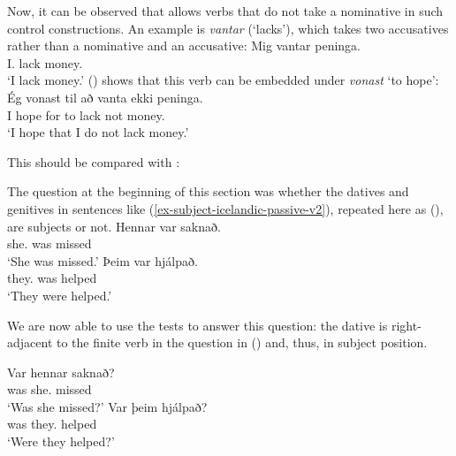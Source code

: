 Now, it can be observed that  allows verbs that do not take a nominative in such control
constructions. An example is \emph{vantar} (`lacks'), which takes two accusatives rather than a
nominative and an accusative:
\ea
\gll Mig      vantar peninga.\\
     I.\ACC{} lack   money.\ACC\\\icelandic
\glt `I lack money.'
\z
() shows that this verb can be embedded under \emph{vonast} `to hope':
\ea
\gll Ég vonast til að vanta ekki peninga.\\
     I  hope   for to lack  not  money.\ACC\\\icelandic
\glt `I hope that I do not lack money.'
\z

\noindent
This should be compared with :
\eal
{}
\zl

\noindent
The question at the beginning of this section was whether the datives and genitives in sentences
like (\ref{ex-subject-icelandic-passive-v2}), repeated here as (), are subjects or not.
\eal
\ex 
\gll Hennar     var saknað.\\
     she.\GEN{} was missed\\\icelandic
\glt `She was missed.'
\ex 
\gll Þeim        var hjálpað.\\
     they.\DAT{} was helped\\
\glt `They were helped.'
\zl

\noindent
We are now able to use the tests to answer this question: the dative is right-adjacent to the finite
verb in the question in () and, thus, in subject position.

\eal
\ex 
\gll Var hennar saknað?\\
     was she.\GEN{} missed\\\icelandic
\glt `Was she missed?'
\ex
\gll Var þeim       hjálpað?\\
     was they.\DAT{} helped   \\
\glt `Were they helped?'
\zl



